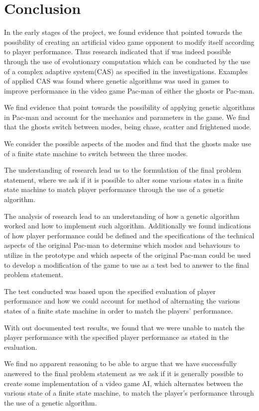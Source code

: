 \section{Conclusion} \label{sec:conclusion}

In the early stages of the project, we found evidence that pointed towards the possibility of creating an artificial video game opponent to modify itself according to player performance. Thus research indicated that if was indeed possible through the use of evolutionary computation which can be conducted by the use of a complex adaptive system(CAS) as specified in the investigations. Examples of applied CAS was found where genetic algorithms was used in games to improve performance in the video game Pac-man of either the ghosts or Pac-man.

We find evidence that point towards the possibility of applying genetic algorithms in Pac-man and account for the mechanics and parameters in the game. We find that the ghosts switch between modes, being chase, scatter and frightened mode.

We consider the possible aspects of the modes and find that the ghosts make use of a finite state machine to switch between the three modes.

The understanding of research lead us to the formulation of the final problem statement, where we ask if it is possible to alter some various states in a finite state machine to match player performance through the use of a genetic algorithm.

The analysis of research lead to an understanding of how a genetic algorithm worked and how to implement such algorithm. Additionally we found indications of how player performance could be defined and the specifications of the technical aspects of the original Pac-man to determine which modes and behaviours to utilize in the prototype and which aspects of the original Pac-man could be used to develop a modification of the game to use as a test bed to answer to the final problem statement.

The test conducted was based upon the specified evaluation of player performance and how we could account for method of alternating the various states of a finite state machine in order to match the players' performance.

With out documented test results, we found that we were unable to match the player performance with the specified player performance as stated in the evaluation.


We find no apparent reasoning to be able to argue that we have successfully answered to the final problem statement as we ask if it is generally possible to create some implementation of a video game AI, which alternates between the various state of a finite state machine, to match the player's performance through the use of a genetic algorithm.

